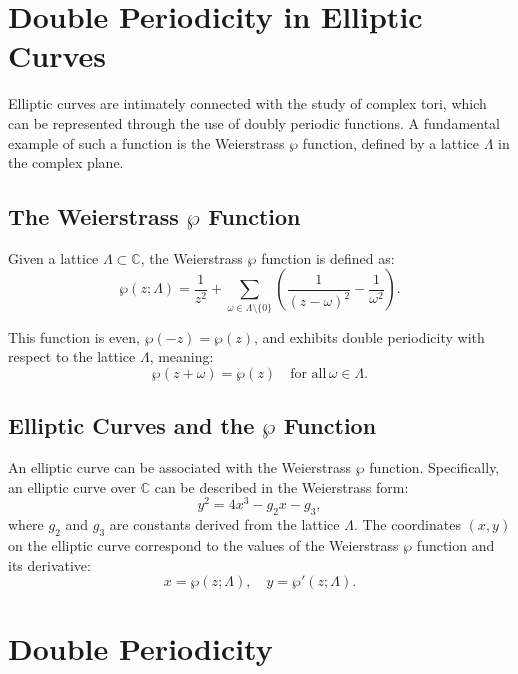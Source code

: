 \newpage
\section*{Double Periodicity in Elliptic Curves}

Elliptic curves are intimately connected with the study of complex tori, which can be represented through the use of doubly periodic functions. A fundamental example of such a function is the Weierstrass $\wp$ function, defined by a lattice $\Lambda$ in the complex plane. 

\subsection*{The Weierstrass $\wp$ Function}

Given a lattice $\Lambda \subset \mathbb{C}$, the Weierstrass $\wp$ function is defined as:
\begin{equation}
	\wp(z; \Lambda) = \frac{1}{z^2} + \sum_{\omega \in \Lambda \setminus \{0\}} \left( \frac{1}{(z - \omega)^2} - \frac{1}{\omega^2} \right).
\end{equation}

This function is even, $\wp(-z) = \wp(z)$, and exhibits double periodicity with respect to the lattice $\Lambda$, meaning:
\begin{equation}
	\wp(z + \omega) = \wp(z) \quad \text{for all} \, \omega \in \Lambda.
\end{equation}

\subsection*{Elliptic Curves and the $\wp$ Function}

An elliptic curve can be associated with the Weierstrass $\wp$ function. Specifically, an elliptic curve over $\mathbb{C}$ can be described in the Weierstrass form:
\begin{equation}
	y^2 = 4x^3 - g_2x - g_3,
\end{equation}
where $g_2$ and $g_3$ are constants derived from the lattice $\Lambda$. The coordinates $(x, y)$ on the elliptic curve correspond to the values of the Weierstrass $\wp$ function and its derivative:
\begin{equation}
	x = \wp(z; \Lambda), \quad y = \wp'(z; \Lambda).
\end{equation}


\section*{Double Periodicity}

